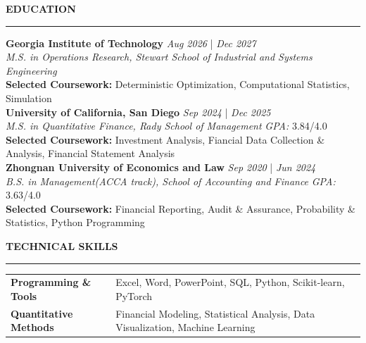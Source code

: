 \documentclass{resume} %
\renewcommand{\sectionskip}{\vspace{0.10cm}}        %
\renewcommand{\sectionlineskip}{\vspace{0.10cm}}
\renewenvironment{rSection}[1]{
\sectionskip
\textcolor{UC San Diego Blue}{\textbf{\large\bfseries\MakeUppercase{#1}}}

\sectionlineskip
\hrule
\begin{list}{}{
\setlength{\leftmargin}{0em}
}
\item[]
}{
\end{list}
}
\begin{document}
\thispagestyle{empty}

\begin{rSection}{EDUCATION}
{\bf Georgia Institute of Technology} \hfill {\em Aug 2026} | {\em Dec 2027}
\\ \textit{M.S. in Operations Research, Stewart School of Industrial and Systems Engineering} \hfill \textit{} \\
\textbf{Selected Coursework:} Deterministic Optimization, Computational Statistics, Simulation \\
{\bf University of California, San Diego} \hfill {\em Sep 2024} | {\em Dec 2025}
\\ \textit{M.S. in Quantitative Finance, Rady School of Management} \hfill \textit{GPA:} 3.84/4.0 \\
\textbf{Selected Coursework:} Investment Analysis, Fiancial Data Collection \& Analysis, Financial Statement Analysis \\
{\bf Zhongnan University of Economics and Law} \hfill {\em Sep 2020} | {\em Jun 2024}
\\ \textit{B.S. in Management(ACCA track), School of Accounting and Finance} \hfill \textit{GPA:} 3.63/4.0 \\
\textbf{Selected Coursework:} Financial Reporting, Audit \& Assurance, Probability \& Statistics, Python Programming

\end{rSection}

\begin{rSection}{TECHNICAL SKILLS} \itemsep -2pt
\begin{tabularx}{\textwidth}{@{} >{\bfseries}l >{\raggedleft\arraybackslash}X @{}}
Programming \& Tools & Excel, Word, PowerPoint, SQL, Python, Scikit-learn, PyTorch \\
Quantitative Methods & Financial Modeling, Statistical Analysis, Data Visualization, Machine Learning \\
\end{tabularx}
\end{rSection}
\end{document}
